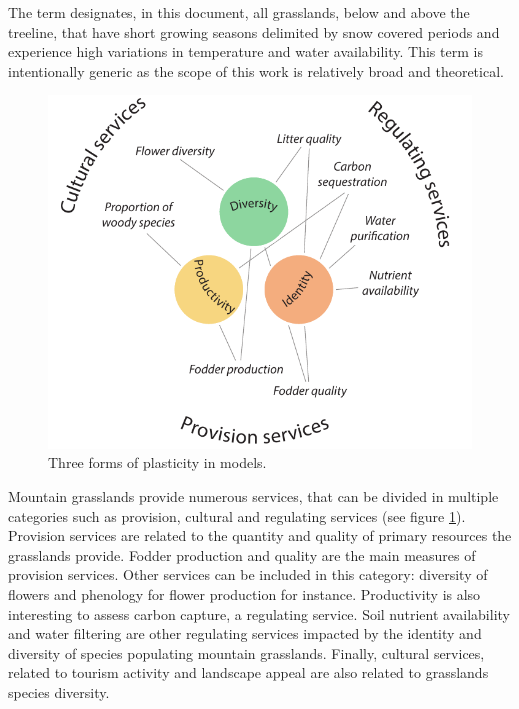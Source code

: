 The term  designates, in this document, all grasslands, below and above the treeline, that have short growing seasons delimited by snow covered periods and experience high variations in temperature and water availability. This term is intentionally generic as the scope of this work is relatively broad and theoretical.

\begin{figure}
    \includegraphics[width=1\linewidth]{./1_Introduction/graphics/services.pdf}
  \caption[Forms of plasticity in models]{Three forms of plasticity in models. }
  \label{fig:services}
\end{figure}

Mountain grasslands provide numerous services, that can be divided in multiple categories such as provision, cultural and regulating services (see figure \ref{fig:services}). Provision services are related to the quantity and quality of primary resources the grasslands provide. Fodder production and quality are the main measures of provision services. Other services can be included in this category: diversity of flowers and phenology for flower production for instance. Productivity is also interesting to assess carbon capture, a regulating service. Soil nutrient availability and water filtering are other regulating services impacted by the identity and diversity of species populating mountain grasslands. Finally, cultural services, related to tourism activity and landscape appeal are also related to grasslands species diversity.


